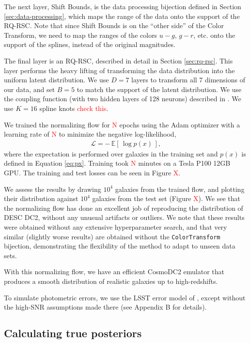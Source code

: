 \documentclass[twocolumn]{aastex631}
\newcommand{\note}[1]{\textsf{\textcolor{red}{#1}}}
\begin{document}
The next layer, Shift Bounds, is the data processing bijection defined in Section \ref{sec:data-processing}, which maps the range of the data onto the support of the RQ-RSC.
Note that since Shift Bounds is on the ``other side'' of the Color Transform, we need to map the ranges of the colors $u-g$, $g-r$, etc. onto the support of the splines, instead of the original magnitudes.

The final layer is an RQ-RSC, described in detail in Section \ref{sec:rq-rsc}.
This layer performs the heavy lifting of transforming the data distribution into the uniform latent distribution.
We use $D=7$ layers to transform all 7 dimensions of our data, and set $B=5$ to match the support of the latent distribution.
We use the coupling function (with two hidden layers of 128 neurons) described in \citet{durkan2019}.
We use $K=16$ spline knots \note{check this}.

We trained the normalizing flow for \note{N} epochs using the Adam optimizer \citep{adam} with a learning rate of \note{N} to minimize the negative log-likelihood,
\begin{align}
    \mathcal{L} = - \, \mathbb{E}[ \, \log p(x) \, ],
\end{align}
where the expectation is performed over galaxies in the training set and $p(x)$ is defined in Equation \ref{eq:px}.
Training took \note{N} minutes on a Tesla P100 12GB GPU.
The training and test losses can be seen in Figure \note{X}.

We assess the results by drawing $10^4$ galaxies from the trained flow, and plotting their distribution against  $10^4$ galaxies from the test set (Figure \note{X}).
We see that the normalizing flow has done an excellent job of reproducing the distribution of DESC DC2, without any unusual artifacts or outliers.
We note that these results were obtained without any extensive hyperparameter search, and that very similar (slightly worse results) are obtained without the \texttt{ColorTransform} bijection, demonstrating the flexibility of the method to adapt to unseen data sets.

With this normalizing flow, we have an efficient CosmoDC2 emulator that produces a smooth distribution of realistic galaxies up to high-redshifts.

To simulate photometric errors, we use the LSST error model of \citet{ivezic2019}, except without the high-SNR assumptions made there (see Appendix B for details).

\subsection{Calculating true posteriors}
\label{sec:true-posteriors}
\end{document}
